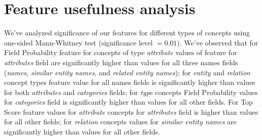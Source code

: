 \documentclass{article}
\begin{document}

\section{Feature usefulness analysis}

We've analyzed significance of our features for different types of concepts
using one-sided Mann-Whitney test (significance level $= 0.01$). We've observed
that for Field Probability feature for concepts of type \emph{attribute} values
of feature for \emph{attributes} field are significantly higher than values for
all three names fields (\emph{names}, \emph{similar entity names}, and
\emph{related entity names}); for \emph{entity} and \emph{relation} concept
types feature value for all names fields is significantly higher than values for
both \emph{attributes} and \emph{categories} fields; for \emph{type} concepts
Field Probability values for \emph{categories} field is significantly higher than values
for all other fields. For Top Score feature values for \emph{attribute} concepts
for \emph{attributes} field is higher than values for all other fields; for
\emph{relation} concepts values for \emph{similar entity names} are
significantly higher than values for all other fields.

{}

\end{document}
